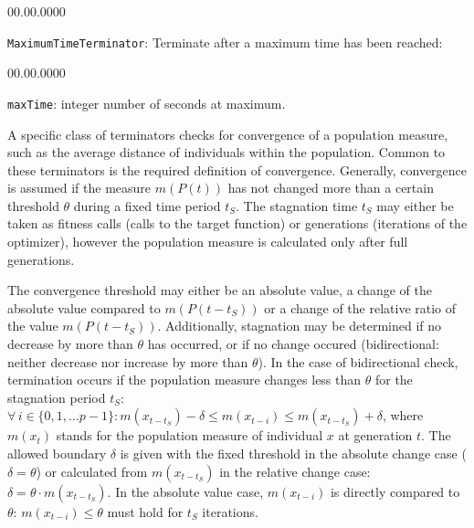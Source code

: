 \begin{lyxlist}{00.00.0000}
\item [{\texttt{MaximumTimeTerminator}:}] Terminate after a maximum time has been reached: 

\begin{lyxlist}{00.00.0000}
\item [{\texttt{maxTime}:}] integer number of seconds
at maximum.
\end{lyxlist}
\end{lyxlist}
A specific class of terminators checks for convergence of a population
measure, such as the average distance of individuals within the population.
Common to these terminators is the required definition of convergence.
Generally, convergence is assumed if the measure $m(P(t))$ has not
changed more than a certain threshold $\theta$ during a fixed time
period $t_{S}$. The stagnation time $t_{S}$ may either be taken
as fitness calls (calls to the target function) or generations (iterations
of the optimizer), however the population measure is calculated only
after full generations.

The convergence threshold may either be an absolute value, a change
of the absolute value compared to $m(P(t-t_{S}))$ or a change of
the relative ratio of the value $m(P(t-t_{S}))$. Additionally, stagnation
may be determined if no decrease by more than \texttt{$\theta$} has
occurred, or if no change occured (bidirectional: neither decrease
nor increase by more than \texttt{$\theta$}). In the case of bidirectional
check, termination occurs if the population measure changes less than
\emph{$\theta$} for the stagnation period \emph{$t_{S}$}: $\forall\, i\in\{0,1,...p-1\}:m(x_{t-t_{S}})-\delta\le m(x_{t-i})\le m(x_{t-t_{S}})+\delta$,
where $m(x_{t})$ stands for the population measure of individual
$x$ at generation $t$. The allowed boundary $\delta$ is given with
the fixed threshold in the absolute change case ($\delta=\theta$)
or calculated from $m(x_{t-t_{S}})$ in the relative change case:
$\delta=\theta\cdot m(x_{t-t_{S}})$. In the absolute value case,
$m(x_{t-i})$ is directly compared to $\theta$: $m(x_{t-i})\leq\theta$
must hold for $t_{S}$ iterations.

